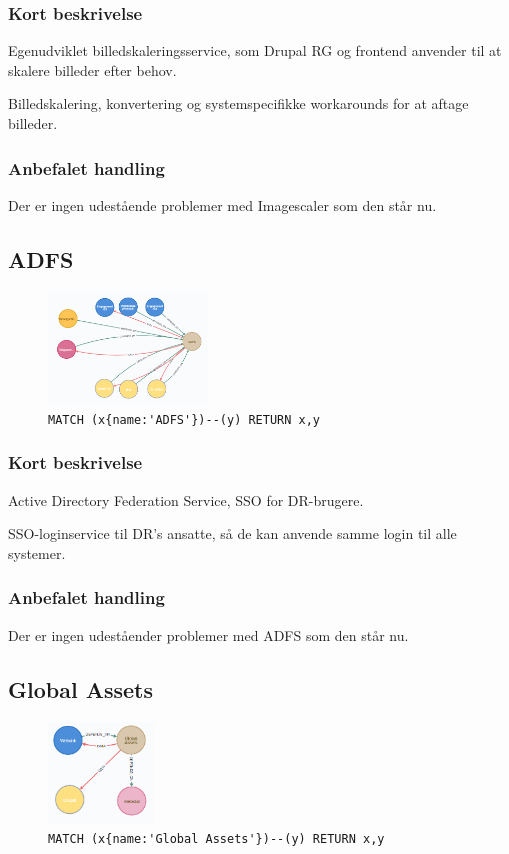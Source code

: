 \documentclass{article}
\begin{document}
\subsubsection*{Kort beskrivelse}
Egenudviklet billedskaleringsservice, som Drupal RG og frontend anvender til at skalere billeder efter behov.	

Billedskalering, konvertering og systemspecifikke workarounds for at aftage billeder.
\subsubsection*{Anbefalet handling}
Der er ingen udestående problemer med Imagescaler som den står nu. 


\subsection{ADFS}
\begin{figure}[H]
\includegraphics[width=120pt]{ADFS.PNG}
\cprotect\caption{\verb|MATCH (x{name:'ADFS'})--(y) RETURN x,y|}
\end{figure}
\subsubsection*{Kort beskrivelse}
Active Directory Federation Service, SSO for DR-brugere.

SSO-loginservice til DR's ansatte, så de kan anvende samme login til alle systemer.
\subsubsection*{Anbefalet handling}
Der er ingen udeståender problemer med ADFS som den står nu.


\subsection{Global Assets}
\begin{figure}[H]
\includegraphics[width=80pt]{GlobalAssets.PNG}
\cprotect\caption{\verb|MATCH (x{name:'Global Assets'})--(y) RETURN x,y|}
\end{figure}
\end{document}
